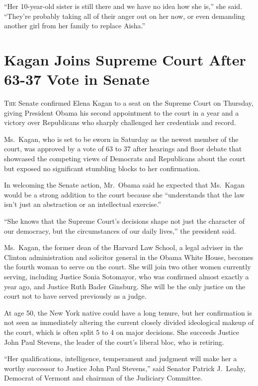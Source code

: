 ﻿\documentclass[12pt]{article}
\begin{document}
``Her 10-year-old sister is still there and we have no idea how she is,'' she said. ``They're
probably taking all of their anger out on her now, or even demanding another girl from her family to
replace Aisha.''

\section{Kagan Joins Supreme Court After 63-37 Vote in Senate}

\lettrine{T}{he} Senate confirmed Elena Kagan to a seat on the Supreme Court
on Thursday, giving President Obama his second appointment to the court in a year and a victory over
Republicans who sharply challenged her credentials and record.

Ms.~Kagan, who is set to be sworn in Saturday as the newest member of the court, was approved by a
vote of 63 to 37 after hearings and floor debate that showcased the competing views of Democrats and
Republicans about the court but exposed no significant stumbling blocks to her confirmation.

In welcoming the Senate action, Mr.~Obama said he expected that Ms.~Kagan would be a strong addition
to the court because she ``understands that the law isn't just an abstraction or an intellectual
exercise.''

``She knows that the Supreme Court's decisions shape not just the character of our democracy, but
the circumstances of our daily lives,'' the president said.

Ms.~Kagan, the former dean of the Harvard Law School, a legal adviser in the Clinton administration
and solicitor general in the Obama White House, becomes the fourth woman to serve on the court. She
will join two other women currently serving, including Justice Sonia Sotomayor, who was confirmed
almost exactly a year ago, and Justice Ruth Bader Ginsburg. She will be the only justice on the
court not to have served previously as a judge.

At age 50, the New York native could have a long tenure, but her confirmation is not seen as
immediately altering the current closely divided ideological makeup of the court, which is often
split 5 to 4 on major decisions. She succeeds Justice John Paul Stevens, the leader of the court's
liberal bloc, who is retiring.

``Her qualifications, intelligence, temperament and judgment will make her a worthy successor to
Justice John Paul Stevens,'' said Senator Patrick J.~Leahy, Democrat of Vermont and chairman of the
Judiciary Committee.
\end{document}
